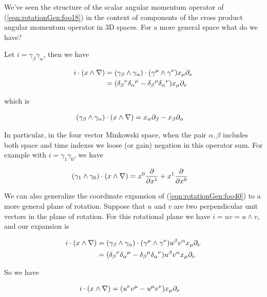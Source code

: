 We've seen the structure of the scalar angular momentum operator of (\ref{eqn:rotationGen:foo18}) in the context of components of the cross product angular momentum operator in 3D spaces.  For a more general space what do we have?

Let $i = \gamma_\beta \gamma_\alpha$, then we have

\begin{align*}
i \cdot (x \wedge \nabla)
&=
(\gamma_\beta \wedge \gamma_\alpha) \cdot (\gamma^\mu  \wedge \gamma^\nu) x_\mu \partial_\nu \\
&=
({\delta_\beta}^\nu {\delta_\alpha}^\mu - {\delta_\beta}^\mu {\delta_\alpha}^\nu ) x_\mu \partial_\nu \\
\end{align*}

which is

\begin{align}\label{eqn:rotationGen:foo40}
(\gamma_\beta \wedge \gamma_\alpha) \cdot (x \wedge \nabla) &= x_\alpha \partial_\beta -x_\beta \partial_\alpha 
\end{align}

In particular, in the four vector Minkowski space, when the pair $\alpha,\beta$ includes both space and time indexes we loose (or gain) negation in this operator sum. For example with $i = \gamma_1 \gamma_0$, we have

\begin{align}\label{eqn:rotationGen:foo41}
(\gamma_1 \wedge \gamma_0) \cdot (x \wedge \nabla) 
&= x^0 \frac{\partial}{\partial x^1} + x^1 \frac{\partial}{\partial x^0}
\end{align}

We can also generalize the coordinate expansion of (\ref{eqn:rotationGen:foo40}) to a more general plane of rotation.  Suppose that $u$ and $v$ are two perpendicular unit vectors in the plane of rotation.  For this rotational plane we have $i=u v = u \wedge v$, and our expansion is

\begin{align*}
i \cdot (x \wedge \nabla) 
&=
(\gamma_\beta \wedge \gamma_\alpha) \cdot (\gamma^\mu  \wedge \gamma^\nu) u^\beta v^\alpha x_\mu \partial_\nu \\
&=
({\delta_\beta}^\nu {\delta_\alpha}^\mu - {\delta_\beta}^\mu {\delta_\alpha}^\nu ) u^\beta v^\alpha x_\mu \partial_\nu \\
\end{align*}

So we have

\begin{align}\label{eqn:rotationGen:foo42}
i \cdot (x \wedge \nabla) 
&=
(u^\nu v^\mu - u^\mu v^\nu) x_\mu \partial_\nu 
\end{align}


